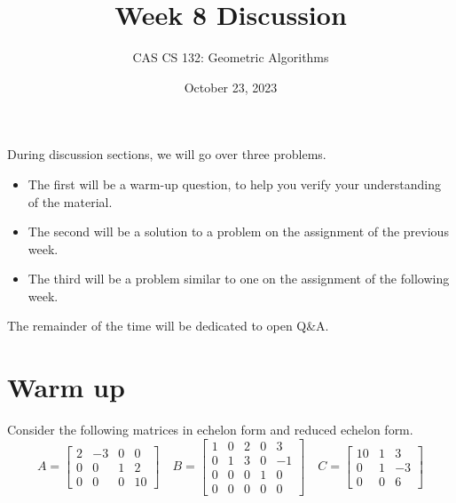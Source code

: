 \documentclass{article}
\title{
  Week 8 Discussion
}
\author{CAS CS 132: Geometric Algorithms}
\date{October 23, 2023}
\theoremstyle{remark}
\begin{document}
\maketitle

\noindent During discussion sections, we will go over three problems.
\begin{itemize}
\item The first will be a warm-up question, to help you verify your understanding of the material.
\item The second will be a solution to a problem on the assignment of the previous week.
\item The third will be a problem similar to one on the assignment of the following week.
\end{itemize}
The remainder of the time will be dedicated to open Q\&A.

\pagebreak
\section{Warm up}
Consider the following matrices in echelon form and reduced echelon form.
\begin{displaymath}
  A =
  \begin{bmatrix}
    2 & -3 & 0 & 0\\
    0 & 0 & 1 & 2 \\
    0 & 0 & 0 & 10
  \end{bmatrix}
  \quad
  B =
  \begin{bmatrix}
    1 & 0 & 2 & 0 & 3 \\
    0 & 1 & 3 & 0 & -1 \\
    0 & 0 & 0 & 1 & 0 \\
    0 & 0 & 0 & 0 & 0
  \end{bmatrix}
  \quad
  C =
  \begin{bmatrix}
    10 & 1 & 3 \\
    0 & 1 & -3 \\
    0 & 0 & 6
  \end{bmatrix}
\end{displaymath}
\end{document}
